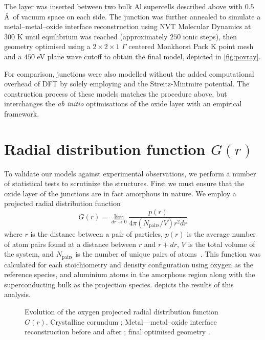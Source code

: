The  layer was inserted between two bulk Al supercells described above with $0.5$ \AA\ of vacuum space on each side.
The junction was further annealed to simulate a metal--metal--oxide interface reconstruction using  NVT Molecular Dynamics at $300$ K until equilibrium was reached (approximately $250$ ionic steps), then geometry optimised using a $2\!\times\!2\!\times\!1$ $\Gamma$ centered Monkhorst Pack K point mesh and a $450$ eV plane wave cutoff to obtain the final model, depicted in \cref{fig:povray}.

For comparison, junctions were also modelled without the added computational overhead of DFT by solely employing  and the Streitz-Mintmire potential.
The construction process of these models matches the procedure above, but interchanges the \textit{ab initio} optimisations of the oxide layer with an empirical framework.

\section{Radial distribution function \texorpdfstring{$G(r)$}{G(r)}}
To validate our models against experimental observations, we perform a number of statistical tests to scrutinize the structures.
First we must ensure that the oxide layer of the junctions are in fact amorphous in nature.
We employ a projected radial distribution function
\begin{equation}
G(r) = \lim_{dr \to 0}\frac{p(r)}{4\pi\left(N_{\mathrm{pairs}}/V\right)r^2dr}
\end{equation}
where $r$ is the distance between a pair of particles, $p(r)$ is the average number of atom pairs found at a distance between $r$ and $r + dr$, $V$ is the total volume of the system, and $N_{\mathrm{pairs}}$ is the number of unique pairs of atoms~\cite{Levine2011}.
This function was calculated for each stoichiometry and density configuration using oxygen as the reference species, and aluminium atoms in the amorphous region along with the superconducting bulk as the projection species.  depicts the results of this analysis.

\begin{figure}[htp]
\centering
\resizebox{0.8\textwidth}{!}{}
\caption[Radial Distribution Function]{\label{fig:groptis}Evolution of the oxygen projected radial distribution function $G(r)$. Crystalline corundum ; Metal---metal--oxide interface reconstruction before  and after ; final optimised geometry .}%
\end{figure}

